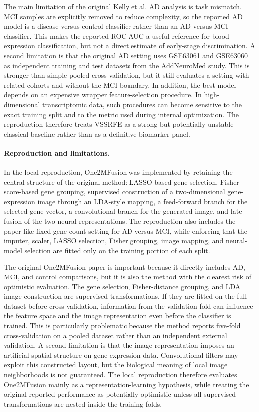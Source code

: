 The main limitation of the original Kelly et al. AD analysis is task mismatch. MCI samples are explicitly removed to reduce complexity, so the reported AD model is a disease-versus-control classifier rather than an AD-versus-MCI classifier. This makes the reported ROC-AUC a useful reference for blood-expression classification, but not a direct estimate of early-stage discrimination. A second limitation is that the original AD setting uses GSE63061 and GSE63060 as independent training and test datasets from the AddNeuroMed study. This is stronger than simple pooled cross-validation, but it still evaluates a setting with related cohorts and without the MCI boundary. In addition, the best model depends on an expensive wrapper feature-selection procedure. In high-dimensional transcriptomic data, such procedures can become sensitive to the exact training split and to the metric used during internal optimization. The reproduction therefore treats VSSRFE as a strong but potentially unstable classical baseline rather than as a definitive biomarker panel.

\paragraph{Reproduction and limitations.}
In the local reproduction, One2MFusion was implemented by retaining the central structure of the original method: LASSO-based gene selection, Fisher-score-based gene grouping, supervised construction of a two-dimensional gene-expression image through an LDA-style mapping, a feed-forward branch for the selected gene vector, a convolutional branch for the generated image, and late fusion of the two neural representations. The reproduction also includes the paper-like fixed-gene-count setting for AD versus MCI, while enforcing that the imputer, scaler, LASSO selection, Fisher grouping, image mapping, and neural-model selection are fitted only on the training portion of each split.

The original One2MFusion paper is important because it directly includes AD, MCI, and control comparisons, but it is also the method with the clearest risk of optimistic evaluation. The gene selection, Fisher-distance grouping, and LDA image construction are supervised transformations. If they are fitted on the full dataset before cross-validation, information from the validation fold can influence the feature space and the image representation even before the classifier is trained. This is particularly problematic because the method reports five-fold cross-validation on a pooled dataset rather than an independent external validation. A second limitation is that the image representation imposes an artificial spatial structure on gene expression data. Convolutional filters may exploit this constructed layout, but the biological meaning of local image neighborhoods is not guaranteed. The local reproduction therefore evaluates One2MFusion mainly as a representation-learning hypothesis, while treating the original reported performance as potentially optimistic unless all supervised transformations are nested inside the training folds.

